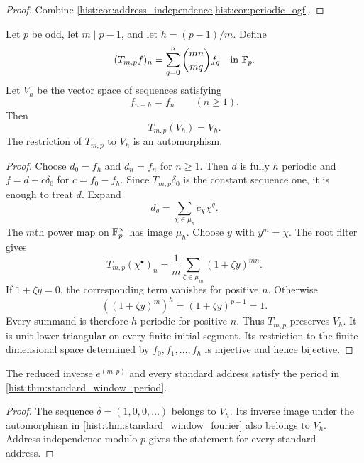 \begin{proof}
Combine \cref{hist:cor:address_independence,hist:cor:periodic_ogf}.
\end{proof}


\begin{histtheorem}\label{hist:thm:standard_window_fourier}
Let \(p\) be odd, let \(m\mid p-1\), and let \(h=(p-1)/m\). Define
\[
(T_{m,p}f)_n
=
\sum_{q=0}^{n}\binom{mn}{mq}f_q
\quad\text{in }\mathbb F_p.
\]
Let \(V_h\) be the vector space of sequences satisfying
\[
f_{n+h}=f_n
\qquad(n\geq1).
\]
Then
\[
\boxed{T_{m,p}(V_h)=V_h.}
\]
The restriction of \(T_{m,p}\) to \(V_h\) is an automorphism.
\end{histtheorem}

\begin{proof}
Choose \(d_0=f_h\) and \(d_n=f_n\) for \(n\geq1\). Then \(d\) is fully \(h\) periodic and \(f=d+c\delta_0\) for \(c=f_0-f_h\). Since \(T_{m,p}\delta_0\) is the constant sequence one, it is enough to treat \(d\). Expand
\[
d_q=\sum_{\chi\in\mu_h}c_\chi\chi^q.
\]
The \(m\)th power map on \(\mathbb F_p^\times\) has image \(\mu_h\). Choose \(y\) with \(y^m=\chi\). The root filter gives
\[
T_{m,p}(\chi^\bullet)_n
=
\frac1m
\sum_{\zeta\in\mu_m}
(1+\zeta y)^{mn}.
\]
If \(1+\zeta y=0\), the corresponding term vanishes for positive \(n\). Otherwise
\[
\left((1+\zeta y)^m\right)^h
=
(1+\zeta y)^{p-1}
=1.
\]
Every summand is therefore \(h\) periodic for positive \(n\). Thus \(T_{m,p}\) preserves \(V_h\). It is unit lower triangular on every finite initial segment. Its restriction to the finite dimensional space determined by \(f_0,f_1,\ldots,f_h\) is injective and hence bijective.
\end{proof}

\begin{histcorollary}\label{hist:cor:standard_window_fourier_period}
The reduced inverse \(e^{(m,p)}\) and every standard address satisfy the period in \cref{hist:thm:standard_window_period}.
\end{histcorollary}

\begin{proof}
The sequence \(\delta=(1,0,0,\ldots)\) belongs to \(V_h\). Its inverse image under the automorphism in \cref{hist:thm:standard_window_fourier} also belongs to \(V_h\). Address independence modulo \(p\) gives the statement for every standard address.
\end{proof}

